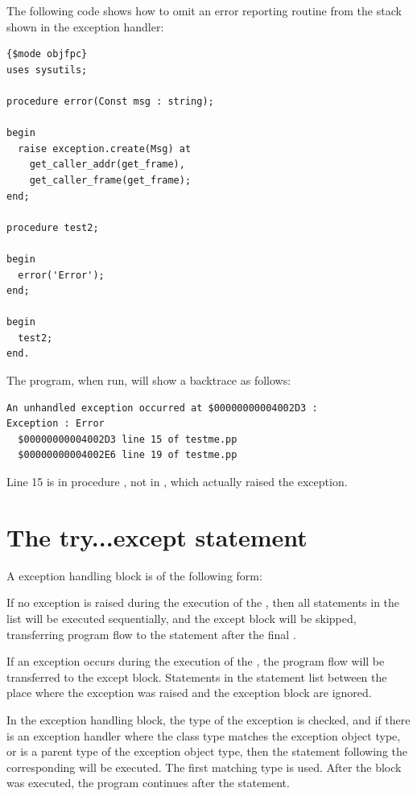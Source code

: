 The following code shows how to omit an error reporting routine from the
stack shown in the exception handler:
\begin{verbatim}
{$mode objfpc}
uses sysutils;

procedure error(Const msg : string);

begin
  raise exception.create(Msg) at
    get_caller_addr(get_frame),
    get_caller_frame(get_frame);
end;

procedure test2;

begin
  error('Error');
end;

begin
  test2;
end.
\end{verbatim}
The program, when run, will show a backtrace as follows:
\begin{verbatim}
An unhandled exception occurred at $00000000004002D3 :
Exception : Error
  $00000000004002D3 line 15 of testme.pp
  $00000000004002E6 line 19 of testme.pp
\end{verbatim}
Line 15 is in procedure , not in , which actually raised the exception.

\section{The try...except statement}
   
A  exception handling block is of the following form:

If no exception is raised during the execution of the ,
then all statements in the list will be executed sequentially, and the
except block will be skipped, transferring program flow to the statement
after the final .

If an exception occurs during the execution of the , the
program flow will be transferred to the except block. Statements in the
statement list between the place where the exception was raised and the
exception block are ignored.

In the exception handling block, the type of the exception is checked,
and if there is an exception handler where the class type matches the
exception object type, or is a parent type of
the exception object type, then the statement following the corresponding
 will be executed. The first matching type is used. After the
 block was executed, the program continues after the 
statement.

